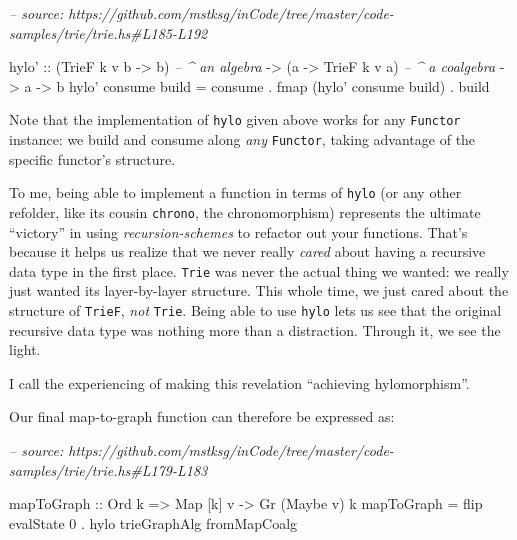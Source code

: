\documentclass[]{article}
\newenvironment{Shaded}{}{}
\newcommand{\CommentTok}[1]{\textcolor[rgb]{0.38,0.63,0.69}{\textit{#1}}}
\newcommand{\DataTypeTok}[1]{\textcolor[rgb]{0.56,0.13,0.00}{#1}}
\newcommand{\DecValTok}[1]{\textcolor[rgb]{0.25,0.63,0.44}{#1}}
\newcommand{\FunctionTok}[1]{\textcolor[rgb]{0.02,0.16,0.49}{#1}}
\newcommand{\NormalTok}[1]{#1}
\newcommand{\OtherTok}[1]{\textcolor[rgb]{0.00,0.44,0.13}{#1}}
\begin{document}
\begin{Shaded}
\begin{Highlighting}[]
\CommentTok{-- source: https://github.com/mstksg/inCode/tree/master/code-samples/trie/trie.hs#L185-L192}

\NormalTok{hylo'}
\OtherTok{    ::}\NormalTok{ (}\DataTypeTok{TrieF}\NormalTok{ k v b }\OtherTok{->}\NormalTok{ b)   }\CommentTok{-- ^ an algebra}
    \OtherTok{->}\NormalTok{ (a }\OtherTok{->} \DataTypeTok{TrieF}\NormalTok{ k v a)   }\CommentTok{-- ^ a coalgebra}
    \OtherTok{->}\NormalTok{ a}
    \OtherTok{->}\NormalTok{ b}
\NormalTok{hylo' consume build }\FunctionTok{=}\NormalTok{ consume}
                    \FunctionTok{.}\NormalTok{ fmap (hylo' consume build)}
                    \FunctionTok{.}\NormalTok{ build}
\end{Highlighting}
\end{Shaded}

Note that the implementation of \texttt{hylo} given above works for any
\texttt{Functor} instance: we build and consume along \emph{any}
\texttt{Functor}, taking advantage of the specific functor's structure.

To me, being able to implement a function in terms of \texttt{hylo} (or any
other refolder, like its cousin \texttt{chrono}, the chronomorphism) represents
the ultimate ``victory'' in using \emph{recursion-schemes} to refactor out your
functions. That's because it helps us realize that we never really \emph{cared}
about having a recursive data type in the first place. \texttt{Trie} was never
the actual thing we wanted: we really just wanted its layer-by-layer structure.
This whole time, we just cared about the structure of \texttt{TrieF}, \emph{not}
\texttt{Trie}. Being able to use \texttt{hylo} lets us see that the original
recursive data type was nothing more than a distraction. Through it, we see the
light.

I call the experiencing of making this revelation ``achieving hylomorphism''.

Our final map-to-graph function can therefore be expressed as:

\begin{Shaded}
\begin{Highlighting}[]
\CommentTok{-- source: https://github.com/mstksg/inCode/tree/master/code-samples/trie/trie.hs#L179-L183}

\NormalTok{mapToGraph}
\OtherTok{    ::} \DataTypeTok{Ord}\NormalTok{ k}
    \OtherTok{=>} \DataTypeTok{Map}\NormalTok{ [k] v}
    \OtherTok{->} \DataTypeTok{Gr}\NormalTok{ (}\DataTypeTok{Maybe}\NormalTok{ v) k}
\NormalTok{mapToGraph }\FunctionTok{=}\NormalTok{ flip evalState }\DecValTok{0} \FunctionTok{.}\NormalTok{ hylo trieGraphAlg fromMapCoalg}
\end{Highlighting}
\end{Shaded}
\end{document}
